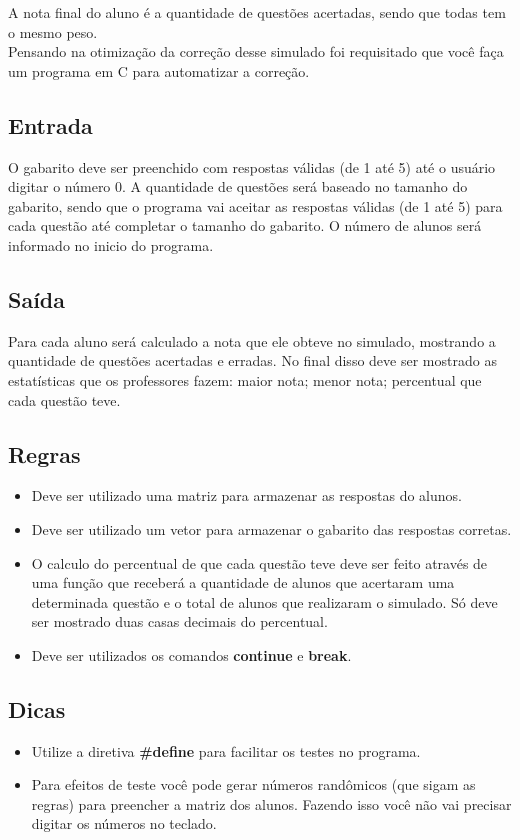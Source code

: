\documentclass{article}
\begin{document}
A nota final do aluno é a quantidade de questões acertadas, sendo que todas tem o mesmo peso.\\

Pensando na otimização da correção desse simulado foi requisitado que você faça um programa em C para automatizar a correção. 

\subsection{Entrada}
O gabarito deve ser preenchido com respostas válidas (de 1 até 5) até o usuário digitar o número 0. A quantidade de questões será baseado no tamanho do gabarito, sendo que o programa vai aceitar as respostas válidas (de 1 até 5) para cada questão até completar o tamanho do gabarito. O número de alunos será informado no inicio do programa.

\subsection{Saída}
Para cada aluno será calculado a nota que ele obteve no simulado, mostrando a quantidade de questões acertadas e erradas. No final disso deve ser mostrado as estatísticas que os professores fazem: maior nota; menor nota; percentual que cada questão teve. 

\subsection{Regras}
\begin{itemize}
	\item Deve ser utilizado uma matriz para armazenar as respostas do alunos.
	\item Deve ser utilizado um vetor para armazenar o gabarito das respostas corretas.
	\item O calculo do percentual de que cada questão teve deve ser feito através de uma função que receberá a quantidade de alunos que acertaram uma determinada questão e o total de alunos que realizaram o simulado. Só deve ser mostrado duas casas decimais do percentual.
	\item Deve ser utilizados os comandos \textbf{continue} e \textbf{break}.
\end{itemize}

\subsection{Dicas}
\begin{itemize}
	\item Utilize a diretiva \textbf{\#define} para facilitar os testes no programa.
	\item Para efeitos de teste você pode gerar números randômicos (que sigam as regras) para preencher a matriz dos alunos. Fazendo isso você não vai precisar digitar os números no teclado. 
\end{itemize}
\end{document}
